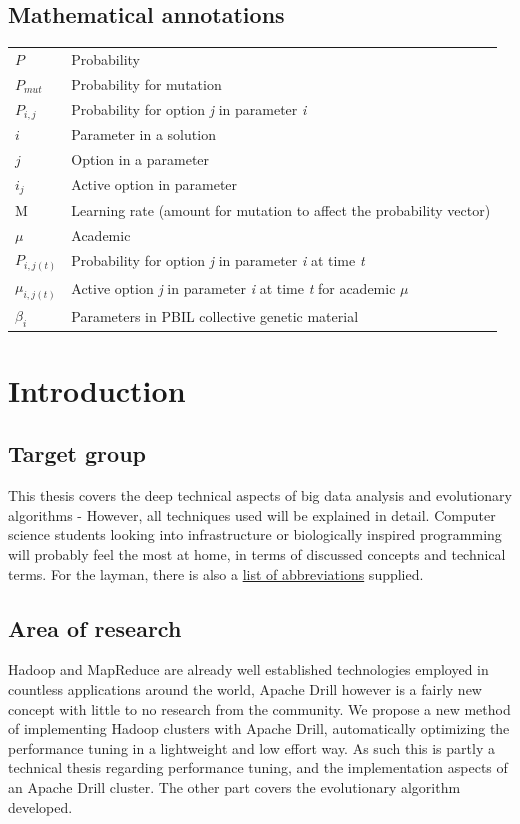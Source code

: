 \documentclass[a4paper,english]{report}
\begin{document}
	\section{Mathematical annotations}
	\label{table:annotations}
	\begin{table}[h]
		\centering
		\begin{tabular}{ll}
			$P$	& Probability \\
			$P_{mut}$	& Probability for mutation \\
			$P_{i,j}$	& Probability for option \textit{j} in parameter \textit{i} \\
			$i$  & Parameter in a solution \\
			$j$ & Option in a parameter \\
			$i_{j}$ & Active option in parameter \\
			M & Learning rate (amount for mutation to affect the probability vector) \\
			$\mu$ & Academic \\
			$P_{i,j(t)}$ & Probability for option \textit{j} in parameter \textit{i} at time \textit{t} \\
			$\mu_{i,j(t)}$ & Active option \textit{j} in parameter \textit{i} at time \textit{t} for academic $\mu$ \\
			$\beta_{i}$ & Parameters in PBIL collective genetic material
			
		\end{tabular}
	\end{table}

	
	\chapter{Introduction}
		
		\section{Target group}
		This thesis covers the deep technical aspects of big data analysis and evolutionary algorithms - However, all techniques used will be explained in detail. Computer science students looking into infrastructure or biologically inspired programming will probably feel the most at home, in terms of discussed concepts and technical terms. For the layman, there is also a \hyperref[word_list]{list of abbreviations} supplied.
		
		\section{Area of research}
		Hadoop and MapReduce are already well established technologies employed in countless applications around the world, Apache Drill however is a fairly new concept with little to no research from the community. We propose a new method of implementing Hadoop clusters with Apache Drill, automatically optimizing the performance tuning in a lightweight and low effort way. As such this is partly a technical thesis regarding performance tuning, and the implementation aspects of an Apache Drill cluster. The other part covers the evolutionary algorithm developed.
		
\end{document}
